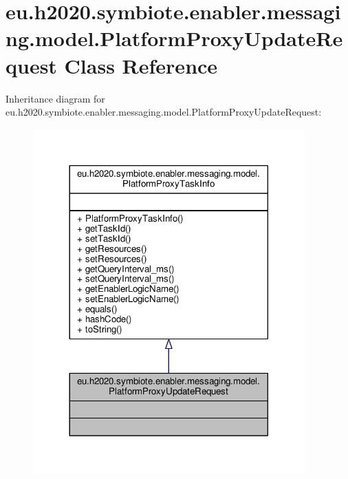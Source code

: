 \hypertarget{classeu_1_1h2020_1_1symbiote_1_1enabler_1_1messaging_1_1model_1_1PlatformProxyUpdateRequest}{}\section{eu.\+h2020.\+symbiote.\+enabler.\+messaging.\+model.\+Platform\+Proxy\+Update\+Request Class Reference}
\label{classeu_1_1h2020_1_1symbiote_1_1enabler_1_1messaging_1_1model_1_1PlatformProxyUpdateRequest}


Inheritance diagram for eu.\+h2020.\+symbiote.\+enabler.\+messaging.\+model.\+Platform\+Proxy\+Update\+Request\+:
\nopagebreak
\begin{figure}[H]
\begin{center}
\leavevmode
\includegraphics[width=296pt]{classeu_1_1h2020_1_1symbiote_1_1enabler_1_1messaging_1_1model_1_1PlatformProxyUpdateRequest__inherit__graph}
\end{center}
\end{figure}


